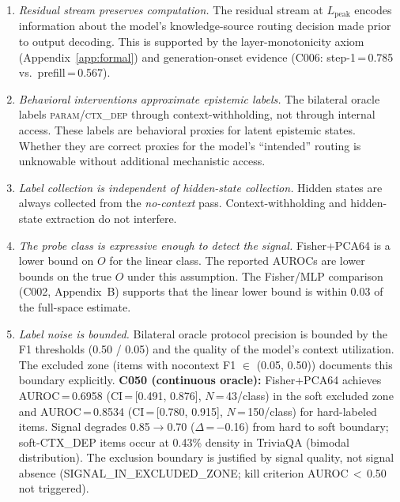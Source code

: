 \documentclass[11pt]{article}
\begin{document}
\begin{enumerate}[leftmargin=2em, label=\textbf{A\arabic*.}]
\item \emph{Residual stream preserves computation.} The residual stream at
  $L_{\text{peak}}$ encodes information about the model's knowledge-source
  routing decision made prior to output decoding. This is supported by the
  layer-monotonicity axiom (Appendix~\ref{app:formal}) and generation-onset
  evidence (C006: step-1\,=\,0.785 vs.\ prefill\,=\,0.567).

\item \emph{Behavioral interventions approximate epistemic labels.} The
  bilateral oracle labels \textsc{param}/\textsc{ctx\_dep} through
  context-withholding, not through internal access. These labels are behavioral
  proxies for latent epistemic states. Whether they are correct proxies for the
  model's ``intended'' routing is unknowable without additional mechanistic
  access.

\item \emph{Label collection is independent of hidden-state collection.}
  Hidden states are always collected from the \emph{no-context} pass.
  Context-withholding and hidden-state extraction do not interfere.

\item \emph{The probe class is expressive enough to detect the signal.}
  Fisher+PCA64 is a lower bound on $O$ for the linear class. The reported
  AUROCs are lower bounds on the true $O$ under this assumption. The Fisher/MLP
  comparison (C002, Appendix~B) supports that the linear lower bound is within
  0.03 of the full-space estimate.

\item \emph{Label noise is bounded.} Bilateral oracle protocol precision is bounded
  by the F1 thresholds (0.50 / 0.05) and the quality of the model's context
  utilization. The excluded zone (items with nocontext F1 $\in$ (0.05, 0.50))
  documents this boundary explicitly. \textbf{C050 (continuous oracle):} Fisher+PCA64
  achieves AUROC\,=\,0.6958 (CI\,=\,[0.491, 0.876], $N$\,=\,43/class) in the soft
  excluded zone and AUROC\,=\,0.8534 (CI\,=\,[0.780, 0.915], $N$\,=\,150/class) for
  hard-labeled items. Signal degrades 0.85$\to$0.70 ($\Delta$\,=\,$-$0.16) from hard
  to soft boundary; soft-CTX\_DEP items occur at 0.43\% density in TriviaQA (bimodal
  distribution). The exclusion boundary is justified by signal quality, not signal
  absence (SIGNAL\_IN\_EXCLUDED\_ZONE; kill criterion AUROC\,$<$\,0.50 not triggered).
\end{enumerate}
\end{document}
